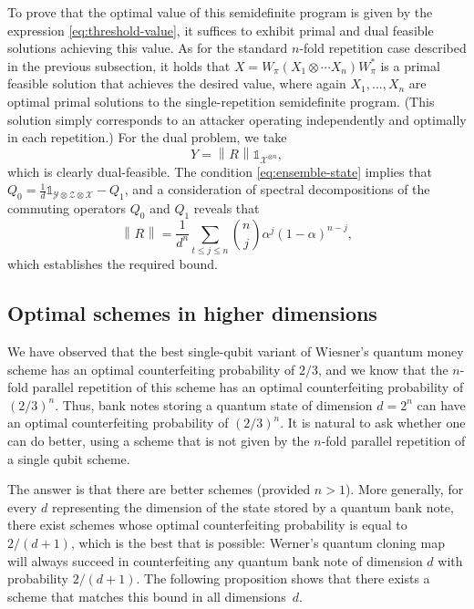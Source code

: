 \documentclass[11pt,letterpaper]{article}
\theoremstyle{definition}
\newcommand{\tinyspace}{\mspace{1mu}}
\newcommand{\norm}[1]{\left\lVert\tinyspace#1\tinyspace\right\rVert}
\def\I{\mathbb{1}}
\def\X{\mathcal{X}}
\def\Y{\mathcal{Y}}
\def\Z{\mathcal{Z}}
\begin{document}
To prove that the optimal value of this semidefinite program is given
by the expression \eqref{eq:threshold-value}, it suffices to exhibit
primal and dual feasible solutions achieving this value.
As for the standard $n$-fold repetition case described in the previous
subsection, it holds that $X =
W_{\pi}(X_1\otimes\cdots X_n)W_{\pi}^{\ast}$ 
is a primal feasible solution that achieves the desired value, where
again $X_1,\ldots,X_n$ are optimal primal solutions to the
single-repetition semidefinite program.
(This solution simply corresponds to an attacker operating
independently and optimally in each repetition.)
For the dual problem, we take
\[
Y = \norm{R} \I_{\X^{\otimes n}},
\]
which is clearly dual-feasible.
The condition \eqref{eq:ensemble-state} implies that
$Q_0 = \frac{1}{d}\I_{\Y\otimes\Z\otimes\X} - Q_1$, and a
consideration of spectral decompositions of the commuting operators
$Q_0$ and $Q_1$ reveals that
\[
\norm{R} = \frac{1}{d^n}
\sum_{t\leq j\leq n}
\binom{n}{j}\alpha^j(1-\alpha)^{n-j},
\]
which establishes the required bound.



\subsection{Optimal schemes in higher dimensions
  \label{sec:opt-higher-dimensions}}

We have observed that the best single-qubit variant of Wiesner's quantum
money scheme has an optimal counterfeiting probability of $2/3$, and
we know that the $n$-fold parallel repetition of this scheme has an optimal
counterfeiting probability of $(2/3)^n$.
Thus, bank notes storing a quantum state of dimension $d = 2^n$ can
have an optimal counterfeiting probability of $(2/3)^n$.
It is natural to ask whether one can do better, using a scheme that is
not given by the $n$-fold parallel repetition of a single qubit
scheme.

The answer is that there are better schemes (provided $n>1$).
More generally, for every $d$ representing the dimension of the state
stored by a quantum bank note, there exist schemes whose optimal
counterfeiting probability is equal to $2/(d+1)$, which is the best
that is possible: Werner's quantum cloning map \cite{Werner98} will
always succeed in counterfeiting any quantum bank note of dimension $d$
with probability $2/(d+1)$. 
The following proposition shows that there exists a scheme that matches
this bound in all dimensions~$d$. 
\end{document}
